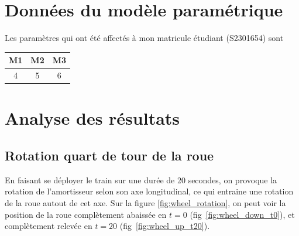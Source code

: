 \documentclass{article}
\begin{document}
\newpage

\newpage
\section{Données du modèle paramétrique}
Les paramètres qui ont été affectés à mon matricule étudiant (S2301654) sont
\begin{center}
    \begin{tabular}{|c|c|c|}
        \hline
        M1 & M2 & M3\\
        \hline
        4 & 5 & 6\\
        \hline
    \end{tabular}
\end{center}

\section{Analyse des résultats}
\subsection{Rotation quart de tour de la roue}

En faisant se déployer le train sur une durée de 20 secondes, on provoque la rotation de l'amortisseur selon son axe longitudinal, ce qui entraine une rotation de la roue autout de cet axe. Sur la figure \ref{fig:wheel_rotation}, on peut voir la position de la roue complètement abaissée en \(t = 0\) (fig~\ref{fig:wheel_down_t0}), et complètement relevée en \(t=20\) (fig~\ref{fig:wheel_up_t20}).
\end{document}
